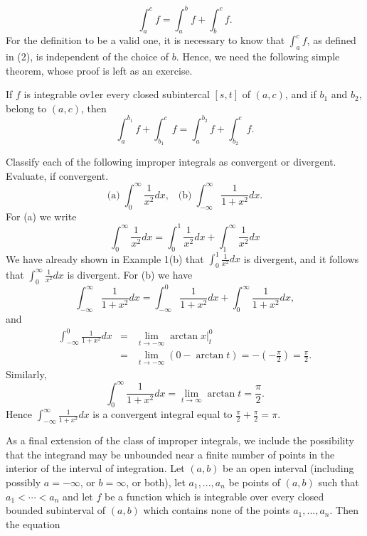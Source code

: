 \begin{equation}
\int_a^c f = \int_a^b f + \int_b^c f.
\label{eq8.7.2}
\end{equation}
\noindent For the definition to be a valid one, it is necessary to know that $\int_a^c f$, as defined in (2), is independent of the choice of $b$. Hence, we need the following simple theorem, whose proof is left as an exercise.

\begin{theorem} %
If $f$ is integrable ov1er every closed subintercal $[s, t]$ of $(a, c)$, and if $b_1$ and $b_2$, belong to $(a, c)$, then
$$
\int_a^{b_1} f + \int_{b_1}^c f = \int_a^{b_2} f + \int_{b_2}^c f  .
$$
\end{theorem}

\begin{example}
Classify each of the following improper integrals as convergent or divergent. Evaluate, if convergent.
$$
\mbox{(a)}\; \int_0^{\infty} \frac{1}{x^2} dx,  \;\;\;\mbox{(b)}\; \int_{-\infty}^\infty \frac{1}{1 + x^2} dx.
$$
\noindent For (a) we write
$$
\int_0^{\infty} \frac{1}{x^2} dx = \int_0^1 \frac{1}{x^2} dx + \int_1^{\infty} \frac{1}{x^2} dx 
$$
\noindent We have already shown in Example 1(b) that $\int_0^1 \frac{1}{x^2} dx$ is divergent, and it follows that $\int_0^{\infty} \frac{1}{x^2} dx$ is divergent. For (b) we have 
$$
\int_{-\infty}^\infty \frac{1}{1 + x^2} dx = \int_{-\infty}^0 \frac{1}{1 + x^2} dx + \int_0^{\infty} \frac{1}{1 + x^2} dx, 
$$
\noindent and 
\begin{eqnarray*}
\int_{-\infty}^0 \frac{1}{1 + x^2} dx &=& \lim_{t \rightarrow -\infty} \arctan x \Big|_t^0 \\
&=& \lim_{t \rightarrow -\infty} (0 - \arctan t) = -(-\frac{\pi}{2}) = \frac{\pi}{2}.
\end{eqnarray*}
\noindent Similarly, 
$$
\int_0^\infty \frac{1}{1 + x^2} dx = \lim_{t \rightarrow \infty} \arctan t = \frac{\pi}{2} .
$$
\noindent Hence $\int_{-\infty}^\infty \frac{1}{1 + x^2} dx$ is a convergent integral equal to $\frac{\pi}{2} + \frac{\pi}{2} = \pi$.
\end{example}

As a final extension of the class of improper integrals, we include the
possibility that the integrand may be unbounded near a finite number of points in the interior of the interval of integration. Let $(a, b)$ be an open interval (including possibly $a = -\infty$, or $b = \infty$, or both), let $a_1, ... , a_n$
be points of $(a, b)$ such that $a_1 < \cdots < a_n$ and let $f$ be a function which is integrable over every closed bounded subinterval of $(a, b)$ which contains none of the points $a_1, ... , a_n$. Then the equation


